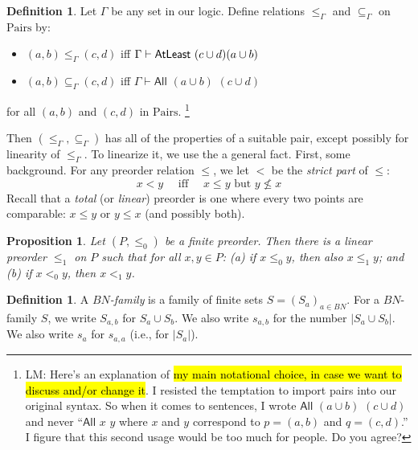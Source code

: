 \documentclass[letterpaper]{article} %
\newtheorem{proposition}[theorem]{Proposition}
\theoremstyle{definition}
\newtheorem{definition}[theorem]{Definition}
\newcommand{\quadiff}{\quad \mbox{ iff } \quad}
\newcommand{\rem}[1]{\relax}
\newcommand{\All}[2]{\mathsf{All}\,\,#1\,\,#2}
\newcommand{\Atleast}[2]{\mathsf{AtLeast}\,\,#1\,\,#2}
\newcommand{\Pairs}{\mbox{Pairs}}
\newcommand{\provsub}{\subseteq_{\Gamma}}
\newcommand{\provle}{\le_{\Gamma}}
\begin{document}
{\begin{definition}\label{def-provle}
Let $\Gamma$ be any set in our logic.
Define relations $\provle$ and $\provsub$ on $\Pairs$ by:

\begin{itemize}%
    \item $(a,b) \provle (c,d)$ iff $\Gamma \vdash  \Atleast{(c \cup d){(a \cup b)}}$
    
    \item $(a,b) \provsub (c,d)$ iff $\Gamma \vdash \All{(a \cup b)}{(c \cup d)}$
\end{itemize}
for all $(a,b)$ and  $(c,d)$ in $\Pairs$.  \footnote{LM: Here's 
an explanation of \hl{my main notational choice, in case we want to 
discuss and/or change it}.  I resisted the temptation to 
import pairs into our original syntax.   So when it comes to 
sentences, I wrote $ \All{(a \cup b)}{(c \cup d)}$
and never ``$\All{x}{y}$ where $x$ and $y$ correspond to $p = (a,b)$
and $q=(c,d)$.''  I figure that this second usage would be too much for people.
Do you agree?
}
\end{definition}

Then $(\provle,\provsub)$ has all of the properties of a suitable pair,
except possibly for linearity of $\provle$.   To linearize it, we use the 
a general fact.  First, some background.
For any preorder relation $\leq$, we let $<$ be the \emph{strict part} of $\leq$:
  \[ x < y \quadiff x \leq y \mbox{ but } y \nleq x\]
 Recall that a \emph{total} (or \emph{linear}) preorder is one where every two points are comparable:
 $x\leq y$ or $y\leq x$ (and possibly both).
 
\begin{proposition}
\label{prop-extension-first}
Let $(P,\leq_0)$ be a finite preorder.  Then there is a linear preorder $\leq_1$ on $P$ 
such that for all $x,y\in P$:
(a) if $x \leq_0 y$, then also $x\leq_1 y$; and 
(b) if $x <_0 y$, then $x <_1 y$.
\rem{
Moreover, for fixed $x^*\in P$, we can also arrange that $\leq_1$ have the following 
additional property:
(c) For all $y$, if $y \nleq_0 x^*$, then $x^* <_1 y$.
}\end{proposition}

\begin{definition}
 A  \emph{$BN$-family} is  a family of  finite sets
$S = (S_a)_{a\in BN}$.
For a $BN$-family $S$, we write $S_{a,b}$ for $S_a \cup S_b$.  We also write $s_{a,b}$
for the number  $|S_a\cup S_b|$.  
We also write $s_a$ for $s_{a,a}$ (i.e., for $|S_a|$).


\end{definition}}
\end{document}
